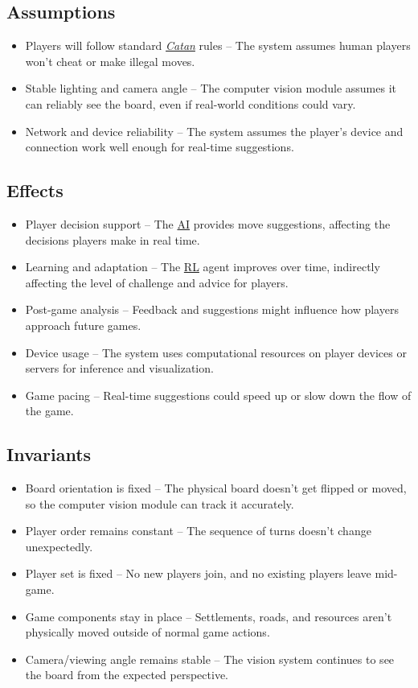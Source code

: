 \documentclass{article}
\newcommand{\Catan}{\href{https://en.wikipedia.org/wiki/Catan}{Catan}}
\newcommand{\AI}{\href{https://en.wikipedia.org/wiki/Artificial_intelligence}{AI}}
\newcommand{\RL}{\href{https://www.ibm.com/think/topics/reinforcement-learning}{RL}}
\begin{document}
\subsection{Assumptions}\label{subsec:assumptions}
\begin{itemize}
    \item {Players will follow standard \emph{\Catan{}} rules} – The system assumes human players won’t cheat or make illegal moves.
    \item {Stable lighting and camera angle} – The computer vision module assumes it can reliably see the board, even if real-world conditions could vary.
    \item {Network and device reliability} – The system assumes the player’s device and connection work well enough for real-time suggestions.
\end{itemize}

\subsection{Effects}\label{subsec:effects}
\begin{itemize}
    \item {Player decision support} – The \AI{} provides move suggestions, affecting the decisions players make in real time.
    \item {Learning and adaptation} – The \RL{} agent improves over time, indirectly affecting the level of challenge and advice for players.
    \item {Post-game analysis} – Feedback and suggestions might influence how players approach future games.
    \item {Device usage} – The system uses computational resources on player devices or servers for inference and visualization.
    \item {Game pacing} – Real-time suggestions could speed up or slow down the flow of the game.
\end{itemize}

\subsection{Invariants}\label{subsec:invariants}
\begin{itemize}
    \item {Board orientation is fixed} – The physical board doesn’t get flipped or moved, so the computer vision module can track it accurately.
    \item {Player order remains constant} – The sequence of turns doesn’t change unexpectedly.
    \item {Player set is fixed} – No new players join, and no existing players leave mid-game.
    \item {Game components stay in place} – Settlements, roads, and resources aren’t physically moved outside of normal game actions.
    \item {Camera/viewing angle remains stable} – The vision system continues to see the board from the expected perspective.
\end{itemize}
\end{document}
